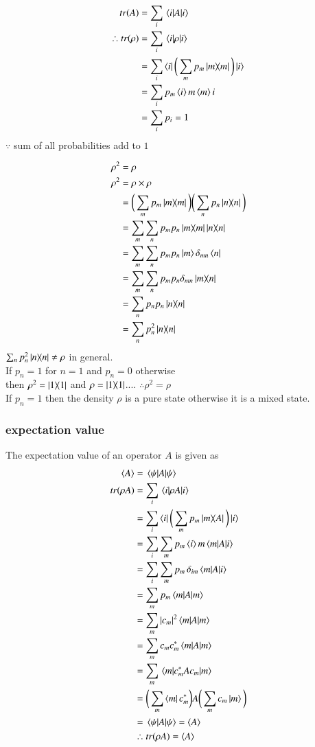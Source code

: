 \begin{align}\label{aft33:11}
tr{(A)} &=\sum_{i}\expval{A}{i} \\ 
\therefore tr{(\rho)} &=\sum_{i}\expval{\rho}{i} \\
 &=\sum_{i}\bra{i}\bigg(\sum_{m}p_{m}\dyad{m}\bigg) \ket{i}  \\
 &=\sum_{i}p_{m}\braket{i}{m} \braket{m}{i}\\
 &=\sum_{i}p_{i} = 1
\end{align}
$\because$ sum of all probabilities add to $1$

\begin{align}\label{aft33:12}
\rho^{2}&={\rho}\\
\rho^{2}&={\rho}\times{\rho}\\
&= \bigg(\sum_{m}p_{m}\dyad{m}\bigg) \bigg(\sum_{n}p_{n}\dyad{n}\bigg)\\
&=\sum_{m}\sum_{n} p_{m}p_{n}\dyad{m}\dyad{n}\\
&=\sum_{m}\sum_{n} p_{m}p_{n} \ket{m} \delta_{mn} \bra{n}\\
&=\sum_{m}\sum_{n} p_{m}p_{n}\delta_{mn} \dyad{m}{n}\\
&=\sum_{n}p_{n}p_{n}\dyad{n}\\
&=\sum_{n}p_{n}^{2}\dyad{n}
\end{align}
$\sum_{n}p_{n}^{2}\dyad{n} \neq \rho$ in general.\\
If $p_{n} = 1 $ for $n=1$ and $p_{n} = 0$ otherwise\\
then $\rho^{2} = \dyad{1}$ and $\rho = \dyad{1}$....
 $\therefore \rho^{2} = \rho$\\
If $p_{n} = 1$ then the density $\rho$ is a pure state otherwise it is a mixed state.

\subsubsection{expectation value}
The expectation value of an operator ${A}$ is given as
\begin{align}\label{aft33:13}
\left\langle{A}\right\rangle &= \expval{A}{\psi}\\
tr(\rho{A}) &=\sum_{i} \expval{\rho{A}}{i}\\
&=\sum_{i} \bra{i} \bigg(\sum_{m}p_{m}\dyad{m} {A}\bigg)\ket{i}\\
&=\sum_{i} \sum_{m}p_{m} \braket{i}{m} \matrixel{m}{A}{i}\\
&=\sum_{i} \sum_{m}p_{m}\thinspace\delta_{im} \matrixel{m}{A}{i}\\
&=\sum_{m}p_{m}\expval{A}{m}\\
&=\sum_{m}\vert{c}_{m}\vert^{2}\expval{A}{m}\\
&=\sum_{m} {c}_{m} {c}_{m}^{*} \expval{A}{m}\\
&=\sum_{m} \expval{{c}_{m}^{*} {A} {c}_{m}}{m}\\
&=\bigg(\sum_{m}\bra{m}{c}_{m}^{*}\bigg) A \bigg(\sum_{m}{c}_{m}\ket{m}\bigg)\\
&=\expval{A}{\psi}=\left\langle{A}\right\rangle\\
&\therefore tr(\rho{A}) =\left\langle{A}\right\rangle
\end{align}

